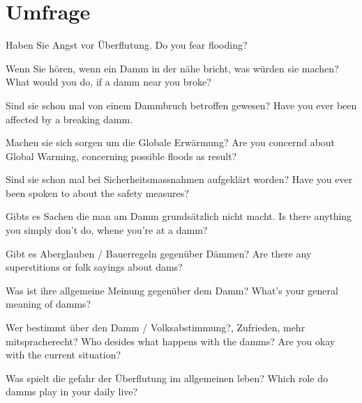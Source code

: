 \part{Umfrage}

Haben Sie Angst vor Überflutung.
Do you fear flooding?


Wenn Sie hören, wenn ein Damm in der nähe bricht, was würden sie machen?
What would you do, if a damm near you broke?


Sind sie schon mal von einem Dammbruch betroffen gewesen?
Have you ever been affected by a breaking damm.

Machen sie sich sorgen um die Globale Erwärmung?
Are you concernd about Global Warming, concerning possible floods as result?

Sind sie schon mal bei Sicherheitsmassnahmen aufgeklärt worden?
Have you ever been spoken to about the safety measures? 

Gibts es Sachen die man am Damm grundsätzlich nicht macht.
Is there anything you simply don't do, whene you're at a damm?

Gibt es Aberglauben / Bauerregeln gegenüber Dämmen?
Are there any superstitions or folk sayings about dams?

Was ist ihre allgemeine Meinung gegenüber dem Damm?
What's your general meaning of damms?


Wer bestimmt über den Damm / Volksabstimmung?, Zufrieden, mehr mitspracherecht?
Who desides what happens with the damms?
Are you okay with the current situation?

Was spielt die gefahr der Überflutung im allgemeinen leben?
Which role do damms play in your daily live?
